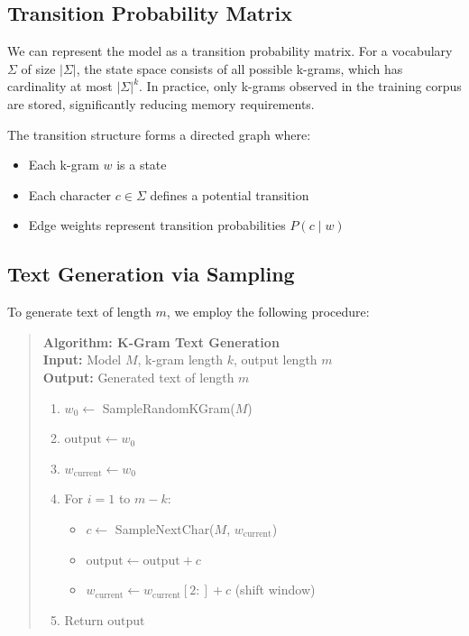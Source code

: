 \documentclass[11pt,letterpaper]{article}
\begin{document}
\subsection{Transition Probability Matrix}

We can represent the model as a transition probability matrix. For a vocabulary $\Sigma$ of size $|\Sigma|$, the state space consists of all possible k-grams, which has cardinality at most $|\Sigma|^k$. In practice, only k-grams observed in the training corpus are stored, significantly reducing memory requirements.

The transition structure forms a directed graph where:
\begin{itemize}
    \item Each k-gram $w$ is a state
    \item Each character $c \in \Sigma$ defines a potential transition
    \item Edge weights represent transition probabilities $P(c \mid w)$
\end{itemize}

\subsection{Text Generation via Sampling}

To generate text of length $m$, we employ the following procedure:

\begin{quote}
\textbf{Algorithm: K-Gram Text Generation}\\
\textbf{Input:} Model $M$, k-gram length $k$, output length $m$\\
\textbf{Output:} Generated text of length $m$
\begin{enumerate}
\item $w_0 \gets$ SampleRandomKGram($M$)
\item $\text{output} \gets w_0$
\item $w_{\text{current}} \gets w_0$
\item For $i = 1$ to $m - k$:
  \begin{itemize}
    \item $c \gets$ SampleNextChar($M$, $w_{\text{current}}$)
    \item $\text{output} \gets \text{output} + c$
    \item $w_{\text{current}} \gets w_{\text{current}}[2:] + c$ (shift window)
  \end{itemize}
\item Return $\text{output}$
\end{enumerate}
\end{quote}
\end{document}
